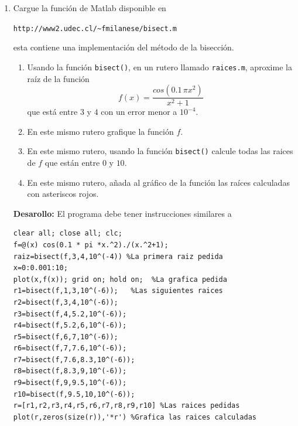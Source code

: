 \documentclass[11pt]{article}
\begin{document}
\begin{enumerate}
\item Cargue la funci\'on de Matlab disponible en
\begin{center}
\texttt{http://www2.udec.cl/\~{}fmilanese/bisect.m}
\end{center}
esta contiene una implementaci\'on del m\'etodo de la bisecci\'on.

\begin{enumerate}
	\item Usando la funci\'on \texttt{bisect()}, en un rutero llamado \texttt{raices.m}, aproxime la ra\'iz de la funci\'on 
    $$
		f(x)=\frac{cos(0.1\,\pi x^2)}{x^2+1}
	$$
    que est\'a entre $3$ y $4$ con un error menor a $10^{-4}$.
    \item En este mismo rutero grafique la funci\'on $f$.
    \item En este mismo rutero, usando la funci\'on \texttt{bisect()} calcule todas las raices de $f$ que est\'an entre $0$ y $10$.
    \item En este mismo rutero, a\~{n}ada al gr\'afico de la funci\'on las ra\'ices calculadas con asteriscos rojos.
\end{enumerate}

\textbf{Desarollo:} El programa debe tener instrucciones similares a
\begin{lstlisting}
clear all; close all; clc;
f=@(x) cos(0.1 * pi *x.^2)./(x.^2+1);
raiz=bisect(f,3,4,10^(-4)) %La primera raiz pedida
x=0:0.001:10;
plot(x,f(x)); grid on; hold on;  %La grafica pedida
r1=bisect(f,1,3,10^(-6));   %Las siguientes raices
r2=bisect(f,3,4,10^(-6));
r3=bisect(f,4,5.2,10^(-6));
r4=bisect(f,5.2,6,10^(-6));
r5=bisect(f,6,7,10^(-6));
r6=bisect(f,7,7.6,10^(-6));
r7=bisect(f,7.6,8.3,10^(-6));
r8=bisect(f,8.3,9,10^(-6));
r9=bisect(f,9,9.5,10^(-6));
r10=bisect(f,9.5,10,10^(-6));
r=[r1,r2,r3,r4,r5,r6,r7,r8,r9,r10] %Las raices pedidas
plot(r,zeros(size(r)),'*r') %Grafica las raices calculadas
\end{lstlisting}

\end{enumerate}
\end{document}
